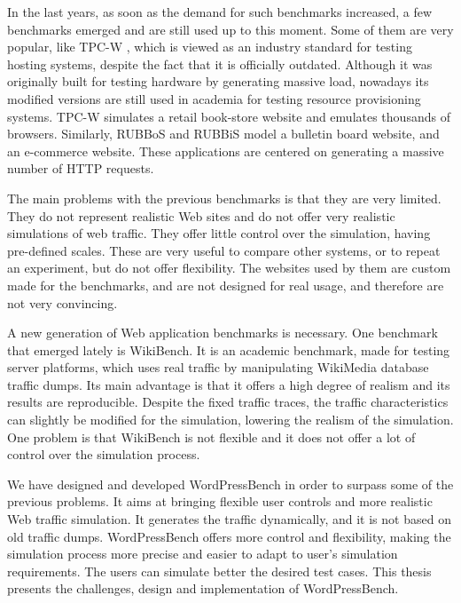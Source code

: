 In the last years, as soon as the demand for such benchmarks increased, a few benchmarks emerged and are still used up to this moment. Some of them are very popular, like TPC-W \cite{TPCW-website}, which is viewed as an industry standard for testing hosting systems, despite the fact that it is officially outdated. Although it was originally built for testing hardware by generating massive load, nowadays its modified versions are still used in academia for testing resource provisioning systems.  TPC-W simulates a retail book-store website and emulates thousands of browsers. Similarly, RUBBoS \cite{RUBBoS-website} and RUBBiS \cite{RUBiS-website} model a bulletin board website, and an e-commerce website. These applications are centered on generating a massive number of HTTP requests.

The main problems with the previous benchmarks is that they are very limited. They do not represent realistic Web sites and do not offer very realistic simulations of web traffic. They offer little control over the simulation, having pre-defined scales. These are very useful to compare other systems, or to repeat an experiment, but do not offer flexibility. The websites used by them are custom made for the benchmarks, and are not designed for real usage, and therefore are not very convincing.

A new generation of Web application benchmarks is necessary. One benchmark that emerged lately is WikiBench. It is an academic  benchmark, made for testing server platforms, which uses real traffic by manipulating WikiMedia database traffic dumps. Its main advantage is that it offers a high degree of realism and its results are reproducible. Despite the fixed traffic traces, the traffic characteristics can slightly be modified for the simulation, lowering the realism of the simulation. One problem is that WikiBench is not flexible and it does not offer a lot of control over the simulation process.

We have designed and developed WordPressBench in order to surpass some of the previous problems. It aims at bringing flexible user controls and more realistic Web traffic simulation. It generates the traffic dynamically, and it is not based on old traffic dumps. WordPressBench offers more control and flexibility, making the simulation process more precise and easier to adapt to user's simulation requirements. The users can simulate better the desired test cases. This thesis presents the challenges, design and implementation of WordPressBench.


